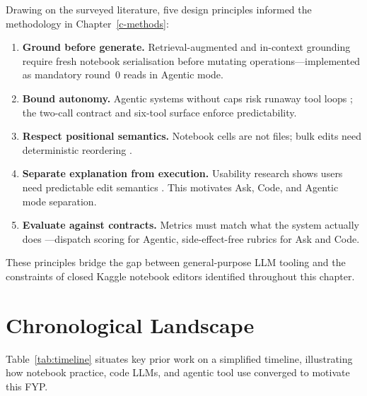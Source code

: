 Drawing on the surveyed literature, five design principles informed the methodology in Chapter~\ref{c-methods}:

\begin{enumerate}
  \item \textbf{Ground before generate.} Retrieval-augmented and in-context grounding \parencite{lewis2020rag} require fresh notebook serialisation before mutating operations---implemented as mandatory round~0 reads in Agentic mode.
  \item \textbf{Bound autonomy.} Agentic systems without caps risk runaway tool loops \parencite{yao2023react,qin2024toolllm}; the two-call contract and six-tool surface enforce predictability.
  \item \textbf{Respect positional semantics.} Notebook cells are not files; bulk edits need deterministic reordering \parencite{rule2019tenrules}.
  \item \textbf{Separate explanation from execution.} Usability research shows users need predictable edit semantics \parencite{mozannar2024reading,vaithilingam2022expectation}. This motivates Ask, Code, and Agentic mode separation.
  \item \textbf{Evaluate against contracts.} Metrics must match what the system actually does \parencite{hou2024llm4se}---dispatch scoring for Agentic, side-effect-free rubrics for Ask and Code.
\end{enumerate}

These principles bridge the gap between general-purpose \ac{LLM} tooling and the constraints of closed Kaggle notebook editors identified throughout this chapter.

\section{Chronological Landscape}
\label{sec:lit-timeline}

Table~\ref{tab:timeline} situates key prior work on a simplified timeline, illustrating how notebook practice, code \acp{LLM}, and agentic tool use converged to motivate this FYP.

